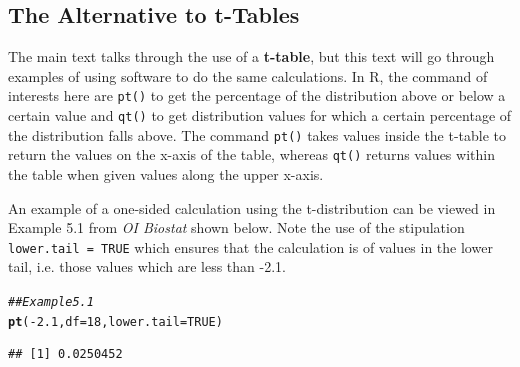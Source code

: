 \documentclass{report}\usepackage[]{graphicx}\usepackage[]{color}
\makeatletter
\newcommand{\hlnum}[1]{\textcolor[rgb]{0.686,0.059,0.569}{#1}}%
\newcommand{\hlcom}[1]{\textcolor[rgb]{0.678,0.584,0.686}{\textit{#1}}}%
\newcommand{\hlopt}[1]{\textcolor[rgb]{0,0,0}{#1}}%
\newcommand{\hlstd}[1]{\textcolor[rgb]{0.345,0.345,0.345}{#1}}%
\newcommand{\hlkwc}[1]{\textcolor[rgb]{0.333,0.667,0.333}{#1}}%
\newcommand{\hlkwd}[1]{\textcolor[rgb]{0.737,0.353,0.396}{\textbf{#1}}}%
\newenvironment{kframe}{%
 \def\at@end@of@kframe{}%
 \ifinner\ifhmode%
  \def\at@end@of@kframe{\end{minipage}}%
  \begin{minipage}{\columnwidth}%
 \fi\fi%
 \def\FrameCommand##1{\hskip\@totalleftmargin \hskip-\fboxsep
 \colorbox{shadecolor}{##1}\hskip-\fboxsep
     \hskip-\linewidth \hskip-\@totalleftmargin \hskip\columnwidth}%
 \MakeFramed {\advance\hsize-\width
   \@totalleftmargin\z@ \linewidth\hsize
   \@setminipage}}%
 {\par\unskip\endMakeFramed%
 \at@end@of@kframe}
\newenvironment{knitrout}{}{} %
\makeatother
\begin{document}
\subsection{The Alternative to t-Tables}
The main text talks through the use of a \textbf{t-table}, but this text will go through examples of using software to do the same calculations.  In \textsf{R}, the command of interests here are \texttt{pt()} to get the percentage of the distribution above or below a certain value and \texttt{qt()} to get distribution values for which a certain percentage of the distribution falls above.  The command \texttt{pt()} takes values inside the t-table to return the values on the x-axis of the table, whereas \texttt{qt()} returns values within the table when given values along the upper x-axis.  

An example of a one-sided calculation using the t-distribution can be viewed in Example 5.1 from \textit{OI Biostat} shown below.  Note the use of the stipulation \texttt{lower.tail = TRUE} which ensures that the calculation is of values in the lower tail, i.e. those values which are less than -2.1.  
\begin{knitrout}
\color{fgcolor}\begin{kframe}
\begin{alltt}
\hlcom{## Example 5.1 }
\hlkwd{pt}\hlstd{(}\hlopt{-}\hlnum{2.1}\hlstd{,} \hlkwc{df} \hlstd{=} \hlnum{18}\hlstd{,} \hlkwc{lower.tail} \hlstd{=} \hlnum{TRUE}\hlstd{)}
\end{alltt}
\begin{verbatim}
## [1] 0.0250452
\end{verbatim}
\end{kframe}
\end{knitrout}
\end{document}

